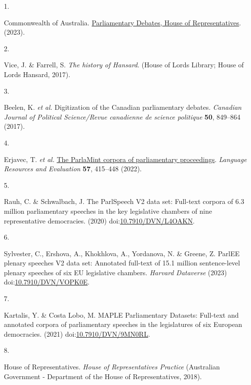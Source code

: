 \documentclass[
  letterpaper,
  DIV=11,
  numbers=noendperiod]{scrartcl}
\newlength{\cslhangindent}
\newlength{\csllabelwidth}
\newlength{\cslentryspacingunit} %
\newenvironment{CSLReferences}[2] %
 {%
  \setlength{\parindent}{0pt}
  \ifodd #1
  \let\oldpar\par
  \def\par{\hangindent=\cslhangindent\oldpar}
  \fi
  \setlength{\parskip}{#2\cslentryspacingunit}
 }%
 {}
\newcommand{\CSLLeftMargin}[1]{\parbox[t]{\csllabelwidth}{#1}}
\newcommand{\CSLRightInline}[1]{\parbox[t]{\linewidth - \csllabelwidth}{#1}\break}
\begin{document}
\hypertarget{refs}{}
\begin{CSLReferences}{0}{0}
\leavevmode{}%
\CSLLeftMargin{1. }%
\CSLRightInline{Commonwealth of Australia.
\href{https://www.aph.gov.au/Parliamentary_Business/Hansard}{{Parliamentary
Debates, House of Representatives}}. (2023).}

\leavevmode{}%
\CSLLeftMargin{2. }%
\CSLRightInline{Vice, J. \& Farrell, S. \emph{{The history of Hansard}}.
(House of Lords Library; House of Lords Hansard, 2017).}

\leavevmode{}%
\CSLLeftMargin{3. }%
\CSLRightInline{Beelen, K. \emph{et al.} {Digitization of the Canadian
parliamentary debates}. \emph{Canadian Journal of Political
Science/Revue canadienne de science politique} \textbf{50}, 849--864
(2017).}

\leavevmode{}%
\CSLLeftMargin{4. }%
\CSLRightInline{Erjavec, T. \emph{et al.}
\href{https://doi.org/10.1007/s10579-021-09574-0}{{The ParlaMint corpora
of parliamentary proceedings}}. \emph{Language Resources and Evaluation}
\textbf{57}, 415--448 (2022).}

\leavevmode{}%
\CSLLeftMargin{5. }%
\CSLRightInline{Rauh, C. \& Schwalbach, J. {The ParlSpeech V2 data set:
Full-text corpora of 6.3 million parliamentary speeches in the key
legislative chambers of nine representative democracies}. (2020)
doi:\href{https://doi.org/10.7910/DVN/L4OAKN}{10.7910/DVN/L4OAKN}.}

\leavevmode{}%
\CSLLeftMargin{6. }%
\CSLRightInline{Sylvester, C., Ershova, A., Khokhlova, A., Yordanova, N.
\& Greene, Z. {ParlEE plenary speeches V2 data set: Annotated full-text
of 15.1 million sentence-level plenary speeches of six EU legislative
chambers}. \emph{Harvard Dataverse} (2023)
doi:\href{https://doi.org/10.7910/DVN/VOPK0E}{10.7910/DVN/VOPK0E}.}

\leavevmode{}%
\CSLLeftMargin{7. }%
\CSLRightInline{Kartalis, Y. \& Costa Lobo, M. {MAPLE Parliamentary
Datasets: Full-text and annotated corpora of parliamentary speeches in
the legislatures of six European democracies}. (2021)
doi:\href{https://doi.org/10.7910/DVN/9MN0RL}{10.7910/DVN/9MN0RL}.}

\leavevmode{}%
\CSLLeftMargin{8. }%
\CSLRightInline{House of Representatives. \emph{{House of
Representatives Practice}} ({Australian Government - Department of the
House of Representatives}, 2018).}


\end{CSLReferences}
\end{document}
